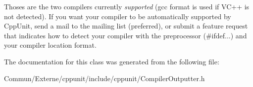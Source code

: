 Thoses are the two compilers currently {\itshape supported} (gcc format is used if V\+C++ is not detected). If you want your compiler to be automatically supported by Cpp\+Unit, send a mail to the mailing list (preferred), or submit a feature request that indicates how to detect your compiler with the preprocessor (\#ifdef...) and your compiler location format. 

The documentation for this class was generated from the following file\+:\begin{DoxyCompactItemize}
\item 
Commun/\+Externe/cppunit/include/cppunit/Compiler\+Outputter.\+h\end{DoxyCompactItemize}
